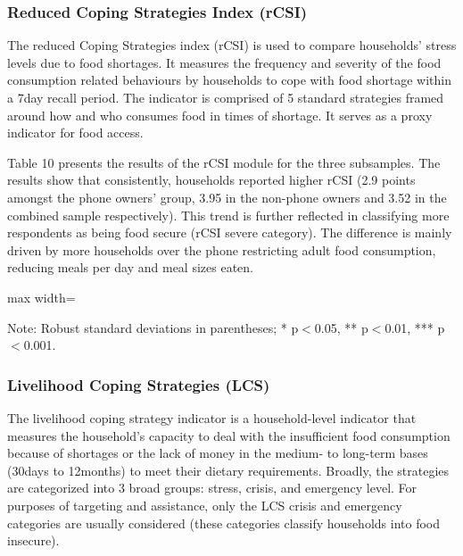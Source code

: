 \documentclass[11pt,harvard]{article}
\begin{document}
	\pagebreak	
	
	
	\subsubsection{Reduced Coping Strategies Index (rCSI)}
	
	The reduced Coping Strategies index (rCSI) is used to compare households’ stress levels due to food shortages. It measures the frequency and severity of the food consumption related behaviours by households to cope with food shortage within a 7day recall period. The indicator is comprised of 5 standard strategies framed around how and who consumes food in times of shortage. It serves as a proxy indicator for food access.
	
	Table 10 presents the results of the rCSI module for the three subsamples. The results show that consistently, households reported higher rCSI (2.9 points amongst the phone owners' group, 3.95 in the non-phone owners and 3.52 in the combined sample respectively). This trend is further reflected in classifying more respondents as being food secure (rCSI severe category). The difference is mainly driven by more households over the phone restricting adult food consumption, reducing meals per day and meal sizes eaten.
	
	
	\begin{table}[htbp]
		\centering
		\begin{adjustbox}{max width=\textwidth}
			\begin{threeparttable}
				\caption{Impact of Survey Modality on Reduced Coping Strategy Index Classification}
				\scriptsize
				 
				\label{tab:rCSI_Modality_BF}
				\begin{tablenotes}
					\item Note: Robust standard deviations in parentheses; * p$<$0.05, ** p$<$0.01, *** p$<$0.001.
				\end{tablenotes}
			\end{threeparttable}
		\end{adjustbox}
	\end{table}
	
	
	\subsubsection{Livelihood Coping Strategies (LCS)}
	
	The livelihood coping strategy indicator is a household-level indicator that measures the household's capacity to deal with the insufficient food consumption because of shortages or the lack of money in the medium- to long-term bases (30days to 12months) to meet their dietary requirements. Broadly, the strategies are categorized into 3 broad groups: stress, crisis, and emergency level. For purposes of targeting and assistance, only the LCS crisis and emergency categories are usually considered (these categories classify households into food insecure).
	
\end{document}

